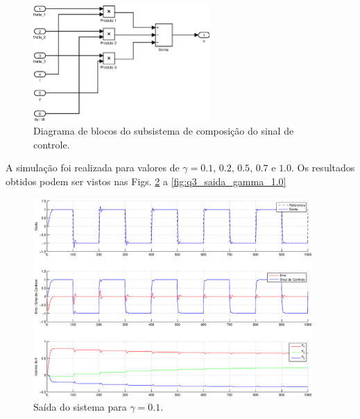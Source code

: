 \begin{figure}[H]
    \centering
    \includegraphics[width=0.6\textwidth]{imgs/questao3/sinal_controle}
    \caption{Diagrama de blocos do subsistema de composição do sinal de
             controle.}
    \label{fig:q3_sinal_cont}
\end{figure}

A simulação foi realizada para valores de $\gamma = 0.1\text{, } 0.2\text{, }
0.5\text{, } 0.7 \text{ e } 1.0$. Os resultados obtidos podem ser vistos nas
Figs. \ref{fig:q3_saida_gamma_0.1} a \ref{fig:q3_saida_gamma_1.0}

\begin{figure}[htb]
    \centering
    \includegraphics[width=0.95\textwidth]{imgs/questao3/saida_gamma_0.1.eps}
    \caption{Saída do sistema para $\gamma = 0.1$.}
    \label{fig:q3_saida_gamma_0.1}
\end{figure}


